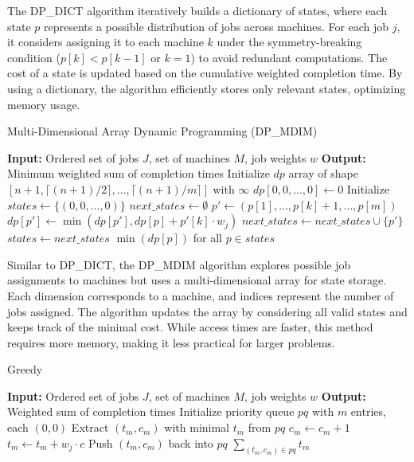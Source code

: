 The DP\_DICT algorithm iteratively builds a dictionary of states, where each state $p$ represents a possible distribution of jobs across machines. For each job $j$, it considers assigning it to each machine $k$ under the symmetry-breaking condition ($p[k] < p[k-1]$ or $k = 1$) to avoid redundant computations. The cost of a state is updated based on the cumulative weighted completion time. By using a dictionary, the algorithm efficiently stores only relevant states, optimizing memory usage.

\begin{algorithm}[H]
    \caption{Multi-Dimensional Array Dynamic Programming (DP\_MDIM)}\label{alg:dpmdim}
    \begin{algorithmic}[1]
        \State \textbf{Input:} Ordered set of jobs $J$, set of machines $M$, job weights $w$
        \State \textbf{Output:} Minimum weighted sum of completion times
        \State Initialize $dp$ array of shape $[n+1, \lceil (n+1)/2 \rceil, \dots, \lceil (n+1)/m \rceil]$ with $\infty$
        \State $dp[0, 0, \dots, 0] \gets 0$
        \State Initialize $states \gets \{(0, 0, \dots, 0)\}$
            \State $next\_states \gets \emptyset$
                        \State $p' \gets (p[1], \dots, p[k]+1, \dots, p[m])$
                        \State $dp[p'] \gets \min(dp[p'], dp[p] + p'[k] \cdot w_j)$
                        \State $next\_states \gets next\_states \cup \{p'\}$
                    \EndIf
                \EndFor
            \EndFor
            \State $states \gets next\_states$
        \EndFor
        \State \Return $\min(dp[p])$ for all $p \in states$
    \end{algorithmic}
\end{algorithm}

Similar to DP\_DICT, the DP\_MDIM algorithm explores possible job assignments to machines but uses a multi-dimensional array for state storage. Each dimension corresponds to a machine, and indices represent the number of jobs assigned. The algorithm updates the array by considering all valid states and keeps track of the minimal cost. While access times are faster, this method requires more memory, making it less practical for larger problems.

\begin{algorithm}[H]
    \caption{Greedy}\label{alg:greedy}
    \begin{algorithmic}[1]
        \State \textbf{Input:} Ordered set of jobs $J$, set of machines $M$, job weights $w$
        \State \textbf{Output:} Weighted sum of completion times
        \State Initialize priority queue $pq$ with $m$ entries, each $(0, 0)$
            \State Extract $(t_m, c_m)$ with minimal $t_m$ from $pq$
            \State $c_m \gets c_m + 1$
            \State $t_m \gets t_m + w_j \cdot c$
            \State Push $(t_m, c_m)$ back into $pq$
        \EndFor
        \State \Return $\sum_{(t_m,c_m) \in pq} t_m$
    \end{algorithmic}
\end{algorithm}

